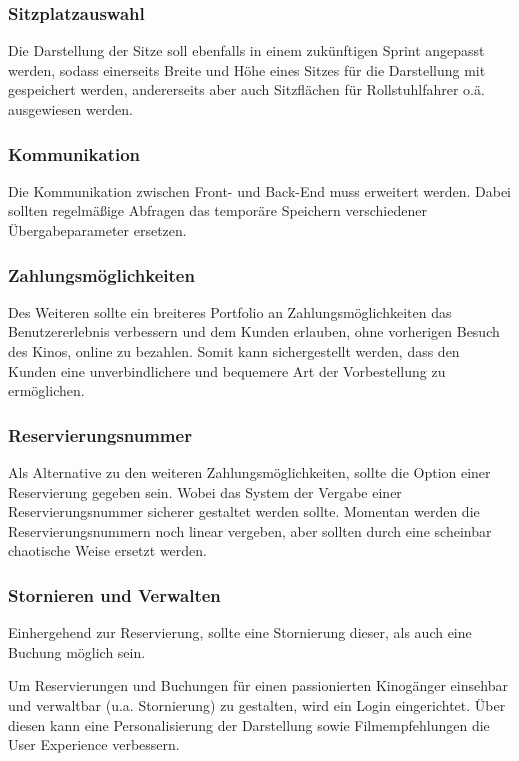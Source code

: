 \subsubsection*{Sitzplatzauswahl}
\label{ssssec:sitzplatzauswahl}
Die Darstellung der Sitze soll ebenfalls in einem zukünftigen Sprint angepasst werden, sodass einerseits Breite und Höhe eines Sitzes für die Darstellung mit gespeichert werden, andererseits aber auch Sitzflächen für Rollstuhlfahrer o.ä. ausgewiesen werden.

\subsubsection*{Kommunikation}
\label{ssssec:kommunikation}
Die Kommunikation zwischen Front- und Back-End muss erweitert werden.
Dabei sollten regelmäßige Abfragen das temporäre Speichern verschiedener Übergabeparameter ersetzen.

\subsubsection*{Zahlungsmöglichkeiten}
\label{ssssec:zahlungsmöglichkeiten}
Des Weiteren sollte ein breiteres Portfolio an Zahlungsmöglichkeiten das Benutzererlebnis verbessern und dem Kunden erlauben, ohne vorherigen Besuch des Kinos, online zu bezahlen.
Somit kann sichergestellt werden, dass den Kunden eine unverbindlichere und bequemere Art der Vorbestellung zu ermöglichen.

\subsubsection*{Reservierungsnummer}
\label{ssssec:reservierungsnummer}
Als Alternative zu den weiteren Zahlungsmöglichkeiten, sollte die Option einer Reservierung gegeben sein.
Wobei das System der Vergabe einer Reservierungsnummer sicherer gestaltet werden sollte.
Momentan werden die Reservierungsnummern noch linear vergeben, aber sollten durch eine scheinbar chaotische Weise ersetzt werden.

\subsubsection*{Stornieren und Verwalten}
\label{ssssec:stornieren_und_verwalten}
Einhergehend zur Reservierung, sollte eine Stornierung dieser, als auch eine Buchung möglich sein.

Um Reservierungen und Buchungen für einen passionierten Kinogänger einsehbar und verwaltbar (u.a. Stornierung) zu gestalten, wird ein Login eingerichtet.
Über diesen kann eine Personalisierung der Darstellung sowie Filmempfehlungen die User Experience verbessern.
